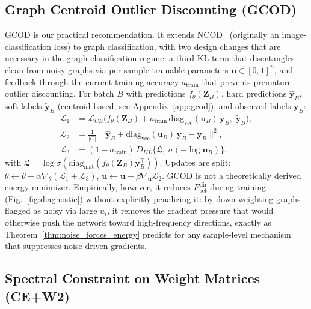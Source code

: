 \documentclass{article}
\theoremstyle{definition}
\newcommand{\method}{GCOD}
\newcommand{\Edirset}{E^{\text{dir}}_{\text{set}}}
\begin{document}
\subsection{Graph Centroid Outlier Discounting (\method{})}

\method{} is our practical recommendation. It extends NCOD~\citep{wani2023combining} (originally an image-classification loss) to graph classification, with two design changes that are necessary in the graph-classification regime: a third KL term that disentangles clean from noisy graphs via per-sample trainable parameters $\mathbf{u}\in[0,1]^n$, and feedback through the current training accuracy $a_{\text{train}}$ that prevents premature outlier discounting. For batch $B$ with predictions $f_\theta(\mathbf{Z}_B)$, hard predictions $\hat{\mathbf{y}}_B$, soft labels $\tilde{\mathbf{y}}_B$ (centroid-based, see Appendix~\ref{app:gcod}), and observed labels $\mathbf{y}_B$:
\begin{align}
\mathcal{L}_1 &= \mathcal{L}_{CE}\bigl(f_\theta(\mathbf{Z}_B)+a_{\text{train}}\,\mathrm{diag}_{\text{vec}}(\mathbf{u}_B)\,\mathbf{y}_B,\;\tilde{\mathbf{y}}_B\bigr),\label{eq:gcod1}\\
\mathcal{L}_2 &= \frac{1}{|C|}\bigl\|\hat{\mathbf{y}}_B+\mathrm{diag}_{\text{vec}}(\mathbf{u}_B)\,\mathbf{y}_B-\mathbf{y}_B\bigr\|^2,\label{eq:gcod2}\\
\mathcal{L}_3 &= (1-a_{\text{train}})\,D_{KL}\bigl\{\mathfrak{L},\;\sigma(-\log\mathbf{u}_B)\bigr\},\label{eq:gcod3}
\end{align}
with $\mathfrak{L}=\log\sigma(\mathrm{diag}_{\text{mat}}(f_\theta(\mathbf{Z}_B)\mathbf{y}_B^\top))$. Updates are split: $\theta\leftarrow\theta-\alpha\nabla_\theta(\mathcal{L}_1+\mathcal{L}_3)$, $\mathbf{u}\leftarrow\mathbf{u}-\beta\nabla_{\mathbf{u}}\mathcal{L}_2$. \method{} is not a theoretically derived energy minimizer. Empirically, however, it reduces $\Edirset$ during training (Fig.~\ref{fig:diagnostic}) without explicitly penalizing it: by down-weighting graphs flagged as noisy via large $u_i$, it removes the gradient pressure that would otherwise push the network toward high-frequency directions, exactly as Theorem~\ref{thm:noise_forces_energy} predicts for any sample-level mechanism that suppresses noise-driven gradients.

\subsection{Spectral Constraint on Weight Matrices (CE+W2)}
\end{document}
